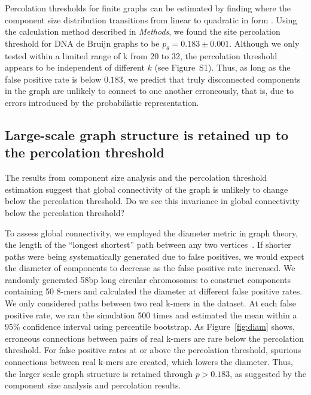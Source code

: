 \documentclass{pnastwo}
\begin{document}
\begin{article}

Percolation thresholds for finite graphs can be estimated by finding
where the component size distribution transitions from linear to
quadratic in form \cite{stauffer1979scaling}.  Using the calculation
method described in \emph{Methods}, we found the site percolation
threshold for DNA de Bruijn graphs to be $p_\theta = 0.183 \pm 0.001$.
Although we only tested within a limited range of k from 20 to 32, the
percolation threshold appears to be independent of different $k$ (see
Figure~S1).
Thus, as long as the false positive rate is below $0.183$, we
predict that truly disconnected components in the graph are unlikely
to connect to one another erroneously, that is, due to errors
introduced by the probabilistic representation.

\subsection{Large-scale graph structure is retained up to the percolation threshold}

The results from component size analysis and the percolation threshold
estimation suggest that global connectivity of the graph is unlikely
to change below the percolation threshold.  Do we see this invariance
in global connectivity below the percolation threshold?

To assess global connectivity, we employed the diameter metric in
graph theory, the length of the ``longest shortest'' path between any two
vertices~\cite{bondy2008graph}.  If shorter paths were being systematically
generated due to false positives, we would expect the diameter of components to
decrease as the false positive rate increased.
We randomly generated 58bp
long circular chromosomes to construct components containing 50 8-mers
and calculated the diameter at different false positive rates. 
We only considered paths
between two real k-mers in the dataset.  
At each
false positive rate, we ran the simulation 500 times and estimated the
mean within a 95\% confidence interval using percentile bootstrap. As
Figure~\ref{fig:diam} shows, erroneous connections between pairs of
real k-mers are rare below the percolation threshold. For false
positive rates at or above the percolation threshold, spurious
connections between real k-mers are created, which lowers the
diameter.  Thus, the larger scale graph structure is retained through
$p > 0.183$, as suggested by the component size analysis and
percolation results.


\end{article}
\end{document}
